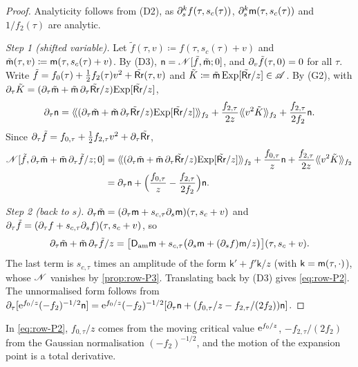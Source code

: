 \begin{proof}
Analyticity follows from (D2), as $\partial_s^kf(\tau,s_c(\tau))$, $\partial_s^k\mathsf{m}(\tau,s_c(\tau))$ and $1/f_2(\tau)$ are analytic.

\emph{Step 1 (shifted variable).} Let $\tilde f(\tau,v)\coloneqq f(\tau,s_c(\tau)+v)$ and $\tilde{\mathsf{m}}(\tau,v)\coloneqq\mathsf{m}(\tau,s_c(\tau)+v)$. By (D3), $\mathsf{n}=\mathscr{N}[\tilde f,\tilde{\mathsf{m}};0]$, and $\partial_v\tilde f(\tau,0)=0$ for all $\tau$. Write $\tilde f=f_0(\tau)+\frac12f_2(\tau)v^2+\tilde{\mathsf{Rr}}(\tau,v)$ and $\tilde K\coloneqq\tilde{\mathsf{m}}\,\mathrm{Exp}[\tilde{\mathsf{Rr}}/z]\in\mathscr{A}$. By (G2), with $\partial_\tau\tilde K=(\partial_\tau\tilde{\mathsf{m}}+\tilde{\mathsf{m}}\,\partial_\tau\tilde{\mathsf{Rr}}/z)\mathrm{Exp}[\tilde{\mathsf{Rr}}/z]$,
\[
\partial_\tau\mathsf{n}=\langle\!\langle (\partial_\tau\tilde{\mathsf{m}}+\tilde{\mathsf{m}}\,\partial_\tau\tilde{\mathsf{Rr}}/z)\mathrm{Exp}[\tilde{\mathsf{Rr}}/z]\rangle\!\rangle_{f_2}+\frac{f_{2,\tau}}{2z}\langle\!\langle v^2\tilde K\rangle\!\rangle_{f_2}+\frac{f_{2,\tau}}{2f_2}\mathsf{n}.
\]
Since $\partial_\tau\tilde f=f_{0,\tau}+\frac12f_{2,\tau}v^2+\partial_\tau\tilde{\mathsf{Rr}}$,
\begin{align*}
\mathscr{N}[\tilde f,\partial_\tau\tilde{\mathsf{m}}+\tilde{\mathsf{m}}\,\partial_\tau\tilde f/z;0]
&=\langle\!\langle (\partial_\tau\tilde{\mathsf{m}}+\tilde{\mathsf{m}}\,\partial_\tau\tilde{\mathsf{Rr}}/z)\mathrm{Exp}[\tilde{\mathsf{Rr}}/z]\rangle\!\rangle_{f_2}+\frac{f_{0,\tau}}{z}\mathsf{n}+\frac{f_{2,\tau}}{2z}\langle\!\langle v^2\tilde K\rangle\!\rangle_{f_2}\\
&=\partial_\tau\mathsf{n}+\Big(\frac{f_{0,\tau}}{z}-\frac{f_{2,\tau}}{2f_2}\Big)\mathsf{n}.
\end{align*}

\emph{Step 2 (back to $s$).} $\partial_\tau\tilde{\mathsf{m}}=(\partial_\tau\mathsf{m}+s_{c,\tau}\partial_s\mathsf{m})(\tau,s_c+v)$ and $\partial_\tau\tilde f=(\partial_\tau f+s_{c,\tau}\partial_sf)(\tau,s_c+v)$, so
\[
\partial_\tau\tilde{\mathsf{m}}+\tilde{\mathsf{m}}\,\partial_\tau\tilde f/z=\big[\mathsf{D}_{\mathrm{am}}\mathsf{m}+s_{c,\tau}\big(\partial_s\mathsf{m}+(\partial_sf)\mathsf{m}/z\big)\big](\tau,s_c+v).
\]
The last term is $s_{c,\tau}$ times an amplitude of the form $\mathsf{k}'+f'\mathsf{k}/z$ (with $\mathsf{k}=\mathsf{m}(\tau,\cdot)$), whose $\mathscr{N}$ vanishes by \cref{prop:row-P3}. Translating back by (D3) gives \eqref{eq:row-P2}. The unnormalised form follows from $\partial_\tau[\mathrm{e}^{f_0/z}(-f_2)^{-1/2}\mathsf{n}]=\mathrm{e}^{f_0/z}(-f_2)^{-1/2}[\partial_\tau\mathsf{n}+(f_{0,\tau}/z-f_{2,\tau}/(2f_2))\mathsf{n}]$.
\end{proof}

In \eqref{eq:row-P2}, $f_{0,\tau}/z$ comes from the moving critical value $\mathrm{e}^{f_0/z}$, $-f_{2,\tau}/(2f_2)$ from the Gaussian normalisation $(-f_2)^{-1/2}$, and the motion of the expansion point is a total derivative.

